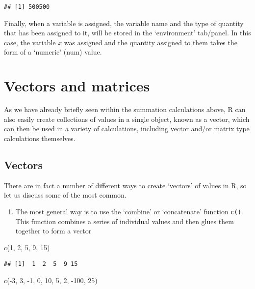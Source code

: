 \documentclass[
]{book}
\newenvironment{Shaded}{\begin{snugshade}}{\end{snugshade}}
\newcommand{\DecValTok}[1]{\textcolor[rgb]{0.00,0.00,0.81}{#1}}
\newcommand{\FunctionTok}[1]{\textcolor[rgb]{0.00,0.00,0.00}{#1}}
\newcommand{\NormalTok}[1]{#1}
\newcommand{\SpecialCharTok}[1]{\textcolor[rgb]{0.00,0.00,0.00}{#1}}
\providecommand{\tightlist}{%
  \setlength{\itemsep}{0pt}\setlength{\parskip}{0pt}}
\theoremstyle{definition}
\theoremstyle{definition}
\theoremstyle{definition}
\theoremstyle{definition}
\theoremstyle{remark}
\begin{document}
\begin{verbatim}
## [1] 500500
\end{verbatim}

Finally, when a variable is assigned, the variable name and the type of quantity that has been assigned to it, will be stored in the `environment' tab/panel. In this case, the variable \(x\) was assigned and the quantity assigned to them takes the form of a `numeric' (num) value.

\hypertarget{vectors-and-matrices}{%
\section{Vectors and matrices}\label{vectors-and-matrices}}

As we have already briefly seen within the summation calculations above, R can also easily create collections of values in a single object, known as a vector, which can then be used in a variety of calculations, including vector and/or matrix type calculations themselves.

\hypertarget{vectors}{%
\subsection{Vectors}\label{vectors}}

There are in fact a number of different ways to create `vectors' of values in R, so let us discuss some of the most common.

\begin{enumerate}
\def\labelenumi{\arabic{enumi}.}
\tightlist
\item
  The most general way is to use the `combine' or `concatenate' function \texttt{c()}. This function combines a series of individual values and then glues them together to form a vector
\end{enumerate}

\begin{Shaded}
\begin{Highlighting}[]
\FunctionTok{c}\NormalTok{(}\DecValTok{1}\NormalTok{, }\DecValTok{2}\NormalTok{, }\DecValTok{5}\NormalTok{, }\DecValTok{9}\NormalTok{, }\DecValTok{15}\NormalTok{)}
\end{Highlighting}
\end{Shaded}

\begin{verbatim}
## [1]  1  2  5  9 15
\end{verbatim}

\begin{Shaded}
\begin{Highlighting}[]
\FunctionTok{c}\NormalTok{(}\SpecialCharTok{{-}}\DecValTok{3}\NormalTok{, }\DecValTok{3}\NormalTok{, }\SpecialCharTok{{-}}\DecValTok{1}\NormalTok{, }\DecValTok{0}\NormalTok{, }\DecValTok{10}\NormalTok{, }\DecValTok{5}\NormalTok{, }\DecValTok{2}\NormalTok{, }\SpecialCharTok{{-}}\DecValTok{100}\NormalTok{, }\DecValTok{25}\NormalTok{)}
\end{Highlighting}
\end{Shaded}
\end{document}
